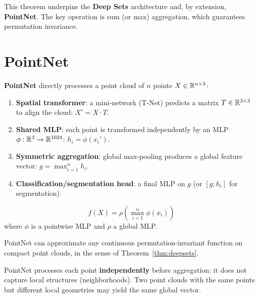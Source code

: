 \begin{remark}
This theorem underpins the \textbf{Deep Sets} architecture and,
by extension, \textbf{PointNet}. The key operation is sum (or max)
aggregation, which guarantees permutation invariance.
\end{remark}

\section{PointNet}
\label{sec:pointnet}

\begin{definition}
\textbf{PointNet} directly processes a point cloud of $n$ points
$X \in \mathbb{R}^{n \times 3}$:
\begin{enumerate}
  \item \textbf{Spatial transformer}: a mini-network (T-Net)
        predicts a matrix $T \in \mathbb{R}^{3 \times 3}$ to align the
        cloud: $X' = X \cdot T$.
  \item \textbf{Shared MLP}: each point is transformed
        independently by an MLP $\phi : \mathbb{R}^3 \to \mathbb{R}^{1024}$:
        $h_i = \phi(x_i')$.
  \item \textbf{Symmetric aggregation}: global max-pooling
        produces a global feature vector:
        $g = \max_{i=1}^n h_i$.
  \item \textbf{Classification/segmentation head}: a final MLP
        on $g$ (or $[g; h_i]$ for segmentation).
\end{enumerate}
\end{definition}

\begin{keyformulas}[title=\textbf{PointNet --- fundamental equation}]
\[
  f(X) = \rho\!\left(\max_{i=1}^n \phi(x_i)\right)
\]
where $\phi$ is a pointwise MLP and $\rho$ a global MLP.
\end{keyformulas}

\begin{proposition}
PointNet can approximate any continuous permutation-invariant
function on compact point clouds, in the sense of
Theorem~\ref{thm:deepsets}.
\end{proposition}

\begin{attention}[title=\textbf{Limitations of PointNet}]
PointNet processes each point \textbf{independently} before
aggregation: it does not capture local structures (neighborhoods).
Two point clouds with the same points but different local
geometries may yield the same global vector.
\end{attention}

